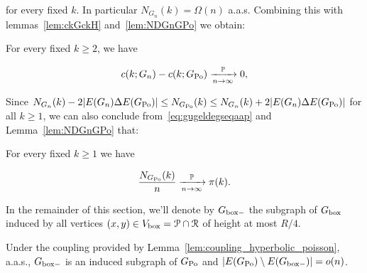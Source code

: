 \noindent
for every fixed $k$.
In particular $N_{G_n}(k) = \Omega(n)$ a.a.s. Combining this with lemmas~\ref{lem:ckGckH} and~\ref{lem:NDGnGPo} we obtain:

\begin{corollary}\label{cor:pok} 
For every fixed $k\geq 2$, we have

$$ c(k; G_n)-c(k; G_{{\mathrm{Po}}}) \xrightarrow[n\to\infty]{\mathbb{P}} 0, $$

\end{corollary}

Since $N_{G_n}(k) - 2|E(G_n)\Delta E(G_{{\mathrm{Po}}})| \leq N_{G_{{\mathrm{Po}}}}(k) \leq N_{G_n}(k) + 2|E(G_n)\Delta E(G_{{\mathrm{Po}}})|$ for all $k\geq 1$,
we can also conclude from~\eqref{eq:gugeldegseqaap} and Lemma~\ref{lem:NDGnGPo} that:


\begin{corollary}\label{cor:NGPok} 
For every fixed $k\geq 1$ we have 

$$ \frac{N_{G_{{\mathrm{Po}}}}(k)}{n} \xrightarrow[n\to\infty]{\mathbb{P}} {\pi}(k). $$

\end{corollary}


In the remainder of this section, we'll denote by $G_{\mathrm{box}-}$ the subgraph of $G_{\mathrm{box}}$ induced by all 
vertices $(x,y) \in V_{\text{box}} = {\mathcal P} \cap {\mathcal R}$ of height at most $R/4$.

\begin{lemma}
Under the coupling provided by Lemma~\ref{lem:coupling_hyperbolic_poisson}, a.a.s., 
$G_{\mathrm{box}-}$ is an induced subgraph of $G_{{\mathrm{Po}}}$ and $|E(G_{{\mathrm{Po}}}) \setminus E(G_{\mathrm{box}-})| = o(n)$.
\end{lemma}

